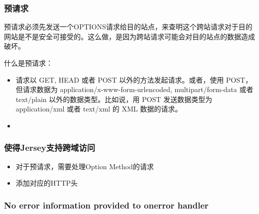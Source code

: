 \subsubsection{预请求}

预请求必须先发送一个OPTIONS请求给目的站点，来查明这个跨站请求对于目的网站是不是安全可接受的。这么做，是因为跨站请求可能会对目的站点的数据造成破坏。

什么是预请求：
\begin{itemize}
\item 请求以 GET, HEAD 或者 POST 以外的方法发起请求。或者，使用 POST，但请求数据为 application/x-www-form-urlencoded, multipart/form-data 或者 text/plain 以外的数据类型。比如说，用 POST 发送数据类型为 application/xml 或者 text/xml 的 XML 数据的请求。
\item
\end{itemize}


\subsubsection{使得Jersey支持跨域访问}

\begin{itemize}
\item 对于预请求，需要处理Option Method的请求
\item 添加对应的HTTP头
\end{itemize}


\subsubsection{No error information provided to onerror handler}


